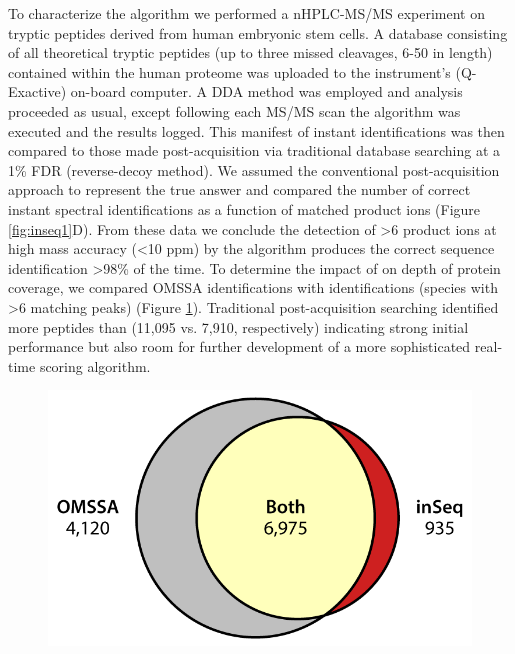 To characterize the \inseq{} algorithm we performed a nHPLC-MS/MS experiment on tryptic peptides derived from human embryonic stem cells. A database consisting of all theoretical tryptic peptides (up to three missed cleavages, 6-50 in length) contained within the human proteome was uploaded to the instrument's (Q-Exactive) on-board computer. A DDA method was employed and analysis proceeded as usual, except following each MS/MS scan the \inseq{} algorithm was executed and the results logged. This manifest of instant identifications was then compared to those made post-acquisition via traditional database searching at a 1\% FDR (reverse-decoy method). We assumed the conventional post-acquisition approach to represent the true answer and compared the number of correct instant spectral identifications as a function of matched product ions (Figure \ref{fig:inseq1}D). From these data we conclude the detection of >6 product ions at high mass accuracy (<10 ppm) by the \inseq{} algorithm produces the correct sequence identification >98\% of the time. To determine the impact of \inseq{} on depth of protein coverage, we compared OMSSA identifications with \inseq{} identifications (species with >6 matching peaks) (Figure \ref{fig:inseqs3}). Traditional post-acquisition searching identified more peptides than \inseq{} (11,095 vs. 7,910, respectively) indicating strong initial performance but also room for further development of a more sophisticated real-time scoring algorithm.
\begin{figure}
	\centering
	\includegraphics[width=\columnwidth]{inseq/inSeq_Fig S3.png}
	\label{fig:inseqs3}
\end{figure}

